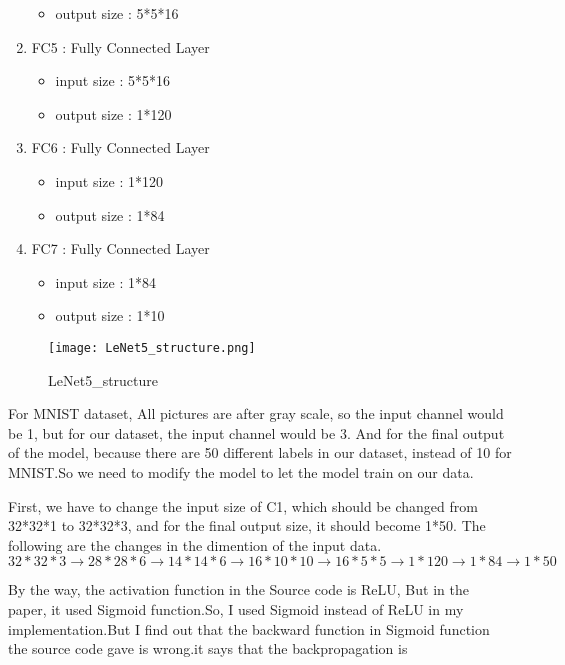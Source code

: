\documentclass[conference]{IEEEtran}
\begin{document}
\begin{enumerate}
\begin{itemize}
            \item output size : 5*5*16
        \end{itemize}
        \item FC5 : Fully Connected Layer
        \begin{itemize}
            \item input size : 5*5*16
            \item output size : 1*120
        \end{itemize}
        \item FC6 : Fully Connected Layer
        \begin{itemize}
            \item input size : 1*120
            \item output size : 1*84
        \end{itemize}
        \item FC7 : Fully Connected Layer
        \begin{itemize}
            \item input size : 1*84
            \item output size : 1*10
        \end{itemize}         
    \end{enumerate}

    \begin{figure}[htb]
        \centering
        \texttt{[image: LeNet5\_structure.png]}
        \caption{LeNet5_structure}
        \label{fig:LeNet5_structure}
    \end{figure}
    
    For MNIST dataset, All pictures are after gray scale, so the input channel would be 1, but for our dataset, the input channel would be 3. And for the final output of the model, because there are 50 different labels in our dataset, instead of 10 for MNIST.So we need to modify the model to let the model train on our data.
    
    \indent First, we have to change the input size of C1, which should be changed from 32*32*1 to 32*32*3, and for the final output size, it should become 1*50. The following are the changes in the dimention of the input data. $32*32*3 \rightarrow 28*28*6 \rightarrow 14*14*6 \rightarrow 16*10*10 \rightarrow  16*5*5 \rightarrow  1*120 \rightarrow 1*84 \rightarrow 1*50$
    
    \indent By the way, the activation function in the Source code is ReLU, But in the paper, it used Sigmoid function.So, I used Sigmoid instead of ReLU in my implementation.But I find out that the backward function in Sigmoid function the source code gave is wrong.it says that the backpropagation is
    
\end{document}
